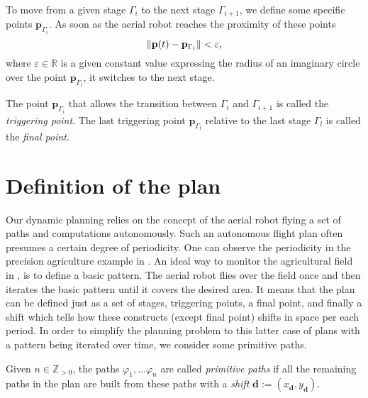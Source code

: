 To move from a given stage $\Gamma_i$ to the next stage $\Gamma_{i+1}$, we define some specific points $\mathbf{p}_{\Gamma_i}$. As soon as the aerial robot reaches the proximity of these points
\begin{equation}\label{eq:trig-vareps}
  \left\lVert\mathbf{p}(t)-\mathbf{p}_{\Gamma_i}\right\rVert<\varepsilon,
\end{equation}
where $\varepsilon\in\mathbb{R}$ is a given constant value expressing the radius of an imaginary circle over the point $\mathbf{p}_{\Gamma_i}$, it switches to the next stage.

\begin{highlight}  
  \begin{defn}\label{def:trigs}
    The point $\mathbf{p}_{\Gamma_{i}}$ that allows the transition between $\Gamma_i$ and $\Gamma_{i+1}$ is called the \emph{triggering point}. The last triggering point $\mathbf{p}_{\Gamma_{l}}$ relative to the last stage $\Gamma_l$ is called the \emph{final point}.
  \end{defn}
\end{highlight}


\section{Definition of the plan}
\label{sec:plan}

Our dynamic planning relies on the concept of the aerial robot flying a set of paths and computations autonomously. Such an autonomous flight plan often presumes a certain degree of periodicity. One can observe the periodicity in the precision agriculture example in . An ideal way to monitor the agricultural field in , is to define a basic pattern. The aerial robot flies over the field once and then iterates the basic pattern until it covers the desired area. It means that the plan can be defined just as a set of stages, triggering points, a final point, and finally a shift which tells how these constructs (except final point) shifts in space per each period. In order to simplify the planning problem to this latter case of plans with a pattern being iterated over time, we consider some primitive paths.

\begin{highlight}
  \begin{defn}\label{def:primitive}
    Given $n\in\mathbb{Z}_{>0}$, the paths $\varphi_1,\dots\varphi_n$ are called \emph{primitive paths} if all the remaining paths in the plan are built from these paths with a \emph{shift} $\mathbf{d}:=(x_{\mathbf{d}},y_{\mathbf{d}})$. 
  \end{defn}
\end{highlight}

